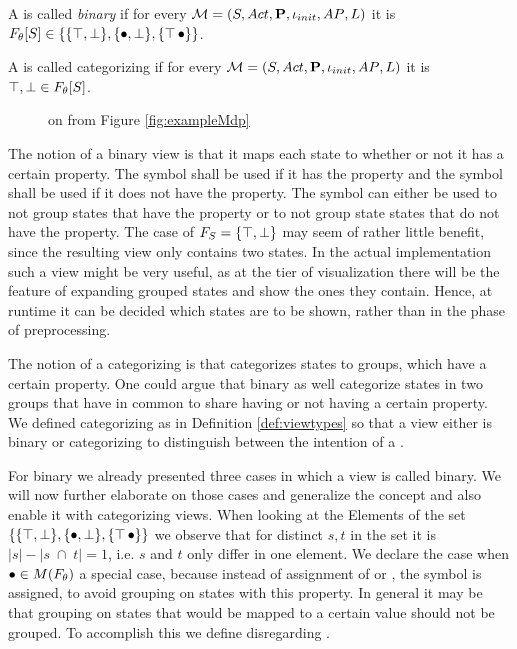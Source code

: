 \documentclass[preview]{standalone}
\begin{document}
\begin{definition}
	\sloppy
	A \viewN \view is called \emph{binary} if for every \chgphN $\chgph = \chgphtuple$ it is ${\grpfct}[\states] \in \{\{\hasppty, \notppty\}, \{\remelem, \notppty\}, \{\hasppty\, \remelem\}\}$. 
	
	\noindent
	A \viewN \view is called categorizing if for every \chgphN $\chgph = \chgphtuple$ it is $\hasppty, \notppty \in {\grpfct}[\states]$. 
	\label{def:viewtypes}
\end{definition}

\begin{figure}[t]
	\centering 
	\caption{\viewNC \view on \chgphN \chgph from Figure \ref{fig:exampleMdp}}
	\label{fig:exampleView}  
\end{figure}

The notion of a binary view is that it maps each state to whether or not it has a certain property. The symbol \hasppty shall be used if it has the property and the symbol \notppty shall be used if it does not have the property. The symbol \remelem can either be used to not group states that have the property or to not group state states that do not have the property. The case of $\grpfct[\states] = \{\hasppty, \notppty\}$ may seem of rather little benefit, since the resulting view only contains two states. In the actual implementation such a view might be very useful, as at the tier of visualization there will be the feature of expanding grouped states and show the ones they contain. Hence, at runtime it can be decided which states are to be shown, rather than in the phase of preprocessing.

The notion of a categorizing \viewN is that categorizes states to groups, which have a certain property. One could argue that binary \viewsN as well categorize states in two groups that have in common to share having or not having a certain property. We defined categorizing \viewsN as in Definition \ref{def:viewtypes} so that a view either is binary or categorizing to distinguish between the intention of a \viewN.

For binary \view we already presented three cases in which a view is called binary. We will now further elaborate on those cases and generalize the concept and also enable it with categorizing views. When looking at the Elements of the set $\{\{\hasppty, \notppty\}, \{\remelem, \notppty\}, \{\hasppty\, \remelem\}\}$ we observe that for distinct $s,t$ in the set it is $|s|-|s \; \cap \; t| = 1$, i.e. $s$ and $t$ only differ in one element. We declare the case when $\remelem \in M(\grpfct)$ a special case, because instead of assignment of \hasppty or \notppty, the symbol \remelem is assigned, to avoid grouping on states with this property. In general it may be that grouping on states that would be mapped to a certain value should not be grouped. To accomplish this we define disregarding \viewsN.
\end{document}
